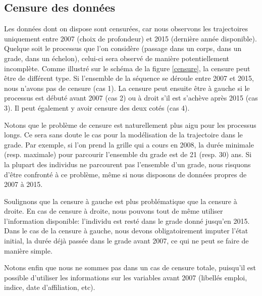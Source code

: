 \documentclass[11pt,a4paper]{article}
\begin{document}
\subsection{Censure des données}

Les données dont on dispose sont censurées, car nous observons les trajectoires uniquement entre 2007 (choix de profondeur) et 2015 (dernière année disponible). Quelque soit le processus que l'on considère (passage dans un corps, dans un grade, dans un échelon), celui-ci sera observé de manière potentiellement incomplète. Comme illustré sur le schéma de la figure  \ref{censure}, la censure peut être de différent type. Si l'ensemble de la séquence se déroule entre 2007 et 2015, nous n'avons pas de censure (cas 1). La censure peut ensuite être à gauche si le processus est débuté avant 2007 (cas 2) ou à droit s'il est s'achève après 2015 (cas 3). Il peut également y avoir censure des deux cotés (cas 4). 

Notons que le problème de censure est naturellement plus aigu pour les processus longs. Ce sera sans doute le cas pour la modélisation de la trajectoire dans le grade. Par exemple, si l'on prend la grille qui a cours en 2008, la durée minimale (resp. maximale) pour parcourir l'ensemble du grade est de 21 (resp. 30) ans. Si la plupart des individus ne parcourent pas l'ensemble d'un grade, nous risquons d'être confronté à ce problème, même si nous disposons de données propres de 2007 à 2015. 

Soulignons que la censure à gauche est plus problématique que la censure à droite. En cas de censure à droite, nous pouvons tout de même utiliser l'information disponible: l'individu est resté dans le grade donné jusqu'en 2015. Dans  le cas de la censure à gauche, nous devons obligatoirement imputer l'état initial, la durée déjà passée dans le grade avant 2007, ce qui ne peut se faire de manière simple. 

Notons enfin que nous ne sommes pas dans un cas de censure totale, puisqu'il est possible d'utiliser les informations sur les variables avant 2007 (libellés emploi, indice, date d'affiliation, etc). 
\end{document}
